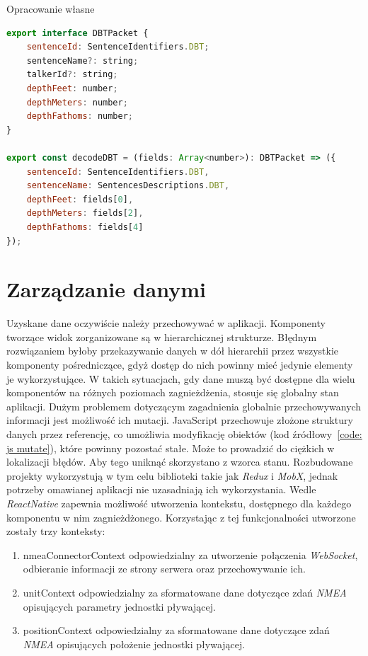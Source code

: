 \documentclass[skorowidz,skroty]{dyplomWEZUT}
\begin{document}
{Opracowanie własne}{\label{code: DBT codec}}
\begin{lstlisting}[language=JavaScript]
export interface DBTPacket {
    sentenceId: SentenceIdentifiers.DBT;
    sentenceName?: string;
    talkerId?: string;
    depthFeet: number;
    depthMeters: number;
    depthFathoms: number;
}

export const decodeDBT = (fields: Array<number>): DBTPacket => ({
    sentenceId: SentenceIdentifiers.DBT,
    sentenceName: SentencesDescriptions.DBT,
    depthFeet: fields[0],
    depthMeters: fields[2],
    depthFathoms: fields[4]
});

\end{lstlisting}

\section{Zarządzanie danymi}\label{sec: server communication}
Uzyskane dane oczywiście należy przechowywać w aplikacji. Komponenty tworzące widok zorganizowane są w hierarchicznej strukturze. Błędnym rozwiązaniem byłoby przekazywanie danych w dół hierarchii przez wszystkie komponenty pośredniczące, gdyż dostęp do nich powinny mieć jedynie elementy je wykorzystujące. W takich sytuacjach, gdy dane muszą być dostępne dla wielu komponentów na różnych poziomach zagnieżdżenia, stosuje się globalny stan aplikacji. Dużym problemem dotyczącym zagadnienia globalnie przechowywanych informacji jest możliwość ich mutacji. JavaScript przechowuje złożone struktury danych przez referencję, co umożliwia modyfikację obiektów (kod źródłowy~\ref{code: js mutate}), które powinny pozostać stałe. Może to prowadzić do ciężkich w lokalizacji błędów. Aby tego uniknąć skorzystano z wzorca stanu. Rozbudowane projekty wykorzystują w tym celu biblioteki takie jak \textit{Redux} i \textit{MobX}, jednak potrzeby omawianej aplikacji nie uzasadniają ich wykorzystania. Wedle \cite{ReactNative} \textit{ReactNative} zapewnia możliwość utworzenia kontekstu, dostępnego dla każdego komponentu w nim zagnieżdżonego. Korzystając z tej funkcjonalności utworzone zostały trzy konteksty:

\begin{enumerate}
 \item nmeaConnectorContext odpowiedzialny za utworzenie połączenia \textit{WebSocket}, odbieranie informacji ze strony serwera oraz przechowywanie ich. 
 
 \item unitContext odpowiedzialny za sformatowane dane dotyczące zdań \textit{NMEA} opisujących parametry jednostki pływającej. 
 
 \item positionContext odpowiedzialny za sformatowane dane dotyczące zdań \textit{NMEA} opisujących położenie jednostki pływającej. 
 
\end{enumerate}
\end{document}
